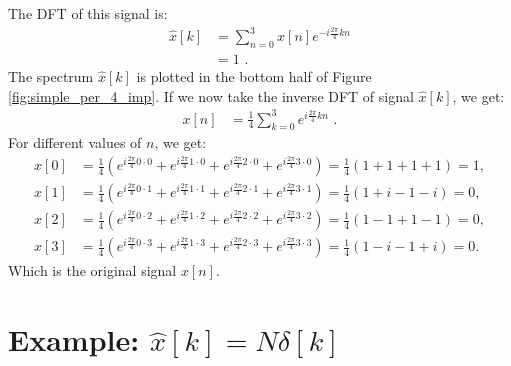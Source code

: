 The DFT of this signal is:
\begin{align}
\hat{x}[k] &= \sum_{n=0}^{3} x[n] e^{-i\frac{2\pi}{4}kn}  \\
&= 1 \,\,.
\end{align}
The spectrum $\hat{x}[k]$ is plotted in the bottom half of Figure \ref{fig:simple_per_4_imp}.
If we now take the inverse DFT of signal $\hat{x}[k]$, we get:
\begin{align}
x[n] & = \frac{1}{4}\sum_{k=0}^{3} e^{i\frac{2\pi}{4}kn} \,\,.
\end{align}
For different values of $n$, we get:
\begin{align*}
x[0] &= \frac{1}{4}(e^{i\frac{2\pi}{4}0\cdot 0} + e^{i\frac{2\pi}{4}1\cdot 0} + e^{i\frac{2\pi}{4}2\cdot 0} + e^{i\frac{2\pi}{4}3\cdot 0})=\frac{1}{4}(1 + 1 + 1 + 1) = 1, \\
x[1] &= \frac{1}{4}(e^{i\frac{2\pi}{4}0\cdot 1} + e^{i\frac{2\pi}{4}1\cdot 1} + e^{i\frac{2\pi}{4}2\cdot 1} + e^{i\frac{2\pi}{4}3\cdot 1}) = \frac{1}{4}(1 + i - 1 - i) = 0, \\
x[2] &= \frac{1}{4}(e^{i\frac{2\pi}{4}0\cdot 2} + e^{i\frac{2\pi}{4}1\cdot 2} + e^{i\frac{2\pi}{4}2\cdot 2} + e^{i\frac{2\pi}{4}3\cdot 2}) = \frac{1}{4}(1 -1  + 1  -1) = 0, \\
x[3] &= \frac{1}{4}(e^{i\frac{2\pi}{4}0\cdot 3} + e^{i\frac{2\pi}{4}1\cdot 3} + e^{i\frac{2\pi}{4}2\cdot 3} + e^{i\frac{2\pi}{4}3\cdot 3}) = \frac{1}{4}(1 - i - 1 + i) = 0. 
\end{align*}
Which is the original signal $x[n]$. 

\section{Example: $\hat{x}[k] = N\delta[k]$}

